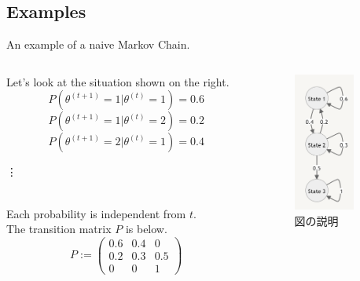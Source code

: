\subsection{Examples}
\begin{frame}
    \begin{exampleblock}{An example of a naive Markov Chain.}
        \begin{columns}
            \begin{column}{0.7\textwidth}
                Let's look at the situation shown on the right.
                \[P(\theta^{(t+1)} = 1  |\theta^{(t)} = 1) = 0.6\]
                \[P(\theta^{(t+1)} = 1  |\theta^{(t)} = 2) = 0.2\]
                \[P(\theta^{(t+1)} = 2  |\theta^{(t)} = 1) = 0.4\]
                \centerline{\vdots}\\
                Each probability is independent from $t$.\\
                The transition matrix $P$ is below.
                \[P := 
                    \begin{pmatrix}
                        0.6 & 0.4 & 0
                        \\0.2 & 0.3 &0.5       
                        \\0 & 0 & 1
                    \end{pmatrix}\]                
            \end{column}
            \begin{column}{0.25\textwidth}
                \begin{figure}[h]
                 \centering
                 \includegraphics[width=2.0cm]
                      {Images/Figures/states transition figure.png}
                 \caption{図の説明}
                 \label{ラベル名}
                \end{figure}
            \end{column}
        \end{columns}        
    \end{exampleblock}
\end{frame}


